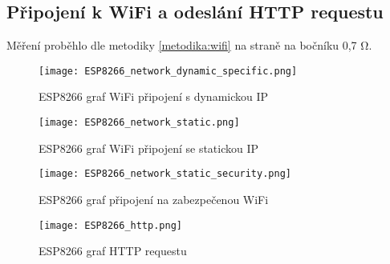 \documentclass[a4paper, 12pt]{report}
\begin{document}
			\subsection{Připojení k WiFi a odeslání HTTP requestu}
				Měření proběhlo dle metodiky \ref{metodika:wifi} na straně \pageref{metodika:wifi} na bočníku 0,7 \si{\ohm}.
				\begin{figure}[h]
					\centering
					\texttt{[image: ESP8266\_network\_dynamic\_specific.png]}
					\caption{ESP8266 graf WiFi připojení s dynamickou IP}
					\label{ESP8266_network_dynamic_specific}
				\end{figure}
				\begin{figure}[h]
					\centering
					\texttt{[image: ESP8266\_network\_static.png]}
					\caption{ESP8266 graf WiFi připojení se statickou IP}
					\label{ESP8266_network_static}
				\end{figure}
				\begin{figure}[h]
					\centering
					\texttt{[image: ESP8266\_network\_static\_security.png]}
					\caption{ESP8266 graf připojení na zabezpečenou WiFi}
					\label{ESP8266_network_static_security}
				\end{figure}
				\begin{figure}[h]
					\centering
					\texttt{[image: ESP8266\_http.png]}
					\caption{ESP8266 graf HTTP requestu}
					\label{ESP8266_http}
				\end{figure}








\end{document}
